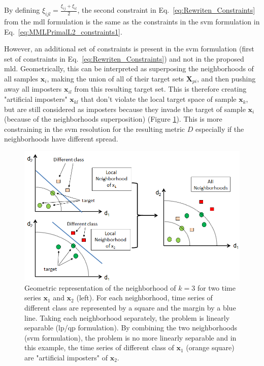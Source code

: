 \noindent By defining $\xi_{ijl}=\frac{\xi_{ij}+\xi_{il}}{2}$, the second constraint in Eq.~\ref{eq:Rewriten_Constraints} from the {\sc mdl} formulation is the same as the constraints in the {\sc svm} formulation in Eq.~\ref{eq:MMLPrimalL2_constraints1}. 

\indent However, an additional set of constraints is present in the {\sc svm} formulation (first set of constraints in Eq.~\ref{eq:Rewriten_Constraints}) and not in the proposed {\sc mld}. Geometrically, this can be interpreted as superposing the neighborhoods of all samples $\textbf{x}_i$, making the union of all of their target sets $\textbf{X}_{pi}$, and then pushing away all imposters $\textbf{x}_{il}$ from this resulting target set. This is therefore creating "artificial imposters" $\textbf{x}_{kl}$ that don't violate the local target space of sample $\textbf{x}_k$, but are still considered as imposters because they invade the target of sample $\textbf{x}_i$ (because of the neighborhoods superposition) (Figure \ref{fig:Neighborhood_scaling_problem}). This is more constraining in the {\sc svm} resolution for the resulting metric $D$ especially if the neighborhoods have different spread. 

\newpage
\begin{figure}[t]
	\centering
	\includegraphics[width=0.8\linewidth]{images/Neighborhood_scaling_problem}
	\caption{Geometric representation of the neighborhood of $k=3$ for two time series $\textbf{x}_1$ and $\textbf{x}_2$ (left). For each neighborhood, time series of different class are represented by a square and the margin by a blue line. Taking each neighborhood separately, the problem is linearly separable ({\sc lp}/{\sc qp} formulation). By combining the two neighborhoods ({\sc svm} formulation), the problem is no more linearly separable and in this example, the time series of different class of $\textbf{x}_1$ (orange square) are "artificial imposters" of $\textbf{x}_2$. }
	\label{fig:Neighborhood_scaling_problem}
\end{figure}


